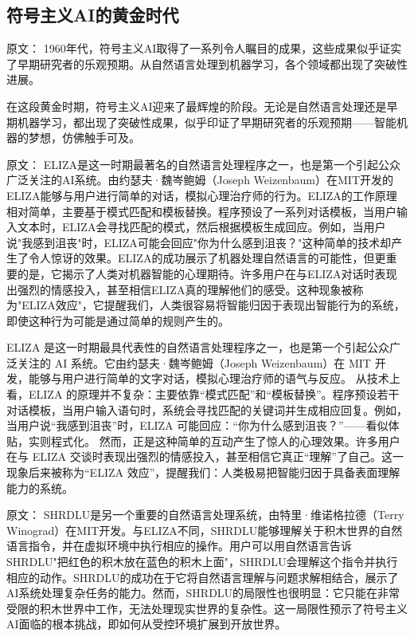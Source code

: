 \subsection{符号主义AI的黄金时代}

原文：
1960年代，符号主义AI取得了一系列令人瞩目的成果，这些成果似乎证实了早期研究者的乐观预期。从自然语言处理到机器学习，各个领域都出现了突破性进展。

在这段黄金时期，符号主义AI迎来了最辉煌的阶段。无论是自然语言处理还是早期机器学习，都出现了突破性成果，似乎印证了早期研究者的乐观预期——智能机器的梦想，仿佛触手可及。

原文：
ELIZA是这一时期最著名的自然语言处理程序之一，也是第一个引起公众广泛关注的AI系统。由约瑟夫·魏岑鲍姆（Joseph Weizenbaum）在MIT开发的ELIZA能够与用户进行简单的对话，模拟心理治疗师的行为。ELIZA的工作原理相对简单，主要基于模式匹配和模板替换。程序预设了一系列对话模板，当用户输入文本时，ELIZA会寻找匹配的模式，然后根据模板生成回应。例如，当用户说"我感到沮丧"时，ELIZA可能会回应"你为什么感到沮丧？"这种简单的技术却产生了令人惊讶的效果。ELIZA的成功展示了机器处理自然语言的可能性，但更重要的是，它揭示了人类对机器智能的心理期待。许多用户在与ELIZA对话时表现出强烈的情感投入，甚至相信ELIZA真的理解他们的感受。这种现象被称为"ELIZA效应"，它提醒我们，人类很容易将智能归因于表现出智能行为的系统，即使这种行为可能是通过简单的规则产生的。

ELIZA 是这一时期最具代表性的自然语言处理程序之一，也是第一个引起公众广泛关注的 AI 系统。它由约瑟夫·魏岑鲍姆（Joseph Weizenbaum）在 MIT 开发，能够与用户进行简单的文字对话，模拟心理治疗师的语气与反应。  
从技术上看，ELIZA 的原理并不复杂：主要依靠“模式匹配”和“模板替换”。程序预设若干对话模板，当用户输入语句时，系统会寻找匹配的关键词并生成相应回复。例如，当用户说“我感到沮丧”时，ELIZA 可能回应：“你为什么感到沮丧？”——看似体贴，实则程式化。  
然而，正是这种简单的互动产生了惊人的心理效果。许多用户在与 ELIZA 交谈时表现出强烈的情感投入，甚至相信它真正“理解”了自己。这一现象后来被称为“ELIZA 效应”，提醒我们：人类极易把智能归因于具备表面理解能力的系统。

原文：
SHRDLU是另一个重要的自然语言处理系统，由特里·维诺格拉德（Terry Winograd）在MIT开发。与ELIZA不同，SHRDLU能够理解关于积木世界的自然语言指令，并在虚拟环境中执行相应的操作。用户可以用自然语言告诉SHRDLU"把红色的积木放在蓝色的积木上面"，SHRDLU会理解这个指令并执行相应的动作。SHRDLU的成功在于它将自然语言理解与问题求解相结合，展示了AI系统处理复杂任务的能力。然而，SHRDLU的局限性也很明显：它只能在非常受限的积木世界中工作，无法处理现实世界的复杂性。这一局限性预示了符号主义AI面临的根本挑战，即如何从受控环境扩展到开放世界。

